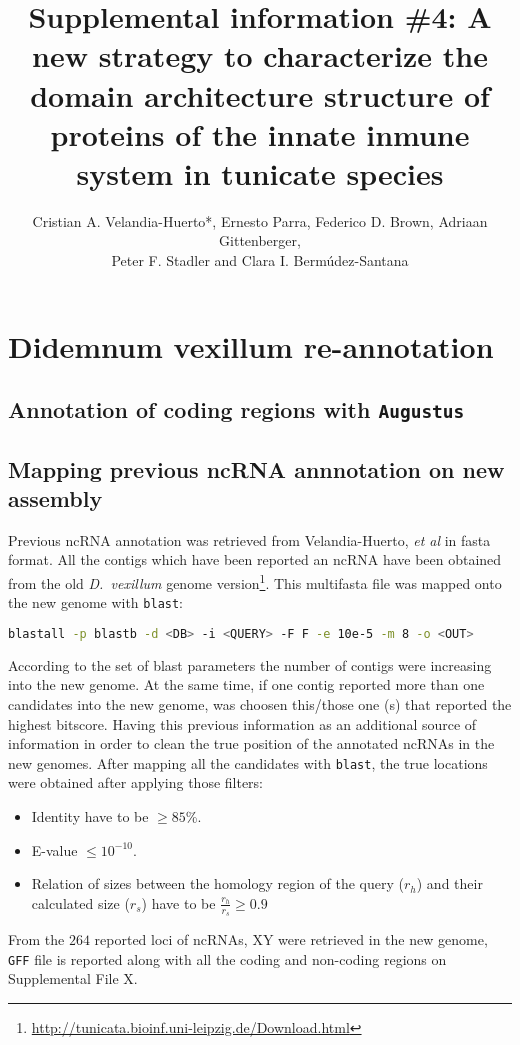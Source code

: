 \documentclass[11pt]{article}
\title{Supplemental information \#4: A new strategy to characterize the domain 
architecture structure of proteins of the innate inmune system in tunicate 
species}
\author{Cristian A. Velandia-Huerto*, Ernesto Parra, Federico D. 
Brown, Adriaan Gittenberger, \\ Peter F. Stadler and Clara I. 
Berm\'{u}dez-Santana}
\begin{document}
\maketitle

\section*{Didemnum vexillum re-annotation}
\subsection*{Annotation of coding regions with \texttt{Augustus}}
\subsection*{Mapping previous ncRNA annnotation on new assembly}
Previous ncRNA annotation was retrieved from Velandia-Huerto, \textit{et al} \cite{} 
in fasta format. All the contigs which have been reported an ncRNA have been obtained
from the old \textit{D.\ vexillum} genome 
version\footnote{\url{http://tunicata.bioinf.uni-leipzig.de/Download.html}}. This
multifasta file was mapped onto the new genome with \texttt{blast}:

\begin{lstlisting}[language=bash, breaklines=true]
blastall -p blastb -d <DB> -i <QUERY> -F F -e 10e-5 -m 8 -o <OUT>
\end{lstlisting}


According to the set of blast parameters the number of contigs were increasing
into the new genome. At the same time, if one contig reported more than one
candidates into the new genome, was choosen this/those one (s) that reported the 
highest bitscore. Having this previous information as an additional source of 
information in order to clean the true position of the annotated ncRNAs in the
new genomes. After mapping all the candidates with \texttt{blast}, the true locations
were obtained after applying those filters:
\begin{itemize}
 \item Identity have to be $\geq 85$\%.
 \item E-value $\leq 10^{-10}$.
 \item Relation of sizes between the homology region of the query
  ($r_h$) and their calculated size ($r_s$) have to be $\frac{r_h}{r_s} \geq 0.9$
\end{itemize}

From the $264$ reported loci of ncRNAs, XY were retrieved in the
new genome, \texttt{GFF} file is reported along with all the coding and non-coding
regions on Supplemental File X.
\end{document}
